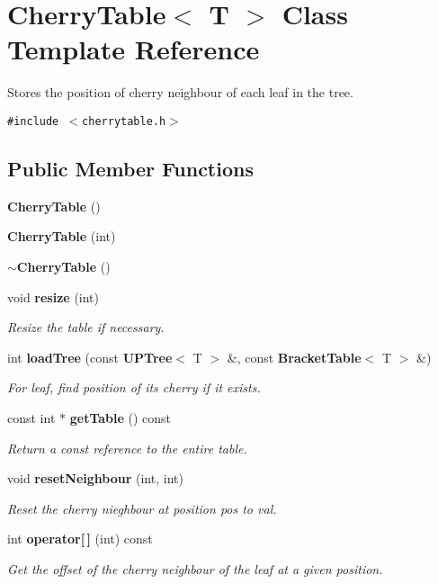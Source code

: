\section{Cherry\-Table$<$ T $>$ Class Template Reference}
\label{classCherryTable}
Stores the position of cherry neighbour of each leaf in the tree.  


{\tt \#include $<$cherrytable.h$>$}

\subsection*{Public Member Functions}
\begin{CompactItemize}
\item 
{\bf Cherry\-Table} ()
\item 
{\bf Cherry\-Table} (int)
\item 
{\bf $\sim$Cherry\-Table} ()
\item 
void {\bf resize} (int)
\begin{CompactList}\small\item\em Resize the table if necessary. \item\end{CompactList}\item 
int {\bf load\-Tree} (const {\bf UPTree}$<$ T $>$ \&, const {\bf Bracket\-Table}$<$ T $>$ \&)
\begin{CompactList}\small\item\em For leaf, find position of its cherry if it exists. \item\end{CompactList}\item 
const int $\ast$ {\bf get\-Table} () const 
\begin{CompactList}\small\item\em Return a const reference to the entire table. \item\end{CompactList}\item 
void {\bf reset\-Neighbour} (int, int)
\begin{CompactList}\small\item\em Reset the cherry nieghbour at position pos to val. \item\end{CompactList}\item 
int {\bf operator[$\,$]} (int) const 
\begin{CompactList}\small\item\em Get the offset of the cherry neighbour of the leaf at a given position. \item\end{CompactList}\end{CompactItemize}
